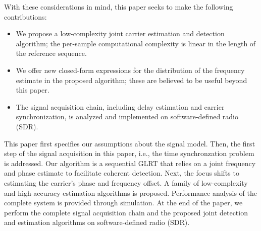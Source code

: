 With these considerations in mind, this paper seeks to make the following contributions:
\begin{itemize}
\item We propose a low-complexity joint carrier estimation and detection algorithm; the per-sample computational complexity is linear
in the length of the reference sequence.
\item We offer new closed-form expressions for the distribution of the frequency estimate in the proposed algorithm; these are believed
to be useful beyond this paper.
\item The signal acquisition chain, including delay estimation and carrier synchronization, is analyzed and implemented on software-defined radio (SDR).
\end{itemize}

This paper first specifies our assumptions about the signal
model. Then, the first step of the signal acquisition in this paper, i.e., the time synchronzation
problem is addressed. Our algorithm is a sequential GLRT that relies on a joint frequency and phase
estimate to facilitate coherent detection. Next, the focus shifts to estimating the carrier's phase 
and frequency offset. A family of low-complexity and high-accuracy estimation algorithms is proposed.
Performance analysis of the complete system is provided through simulation. At the end of the paper,
we perform the complete signal acquisition chain and the proposed joint detection and estimation algorithms
on software-defined radio (SDR).





